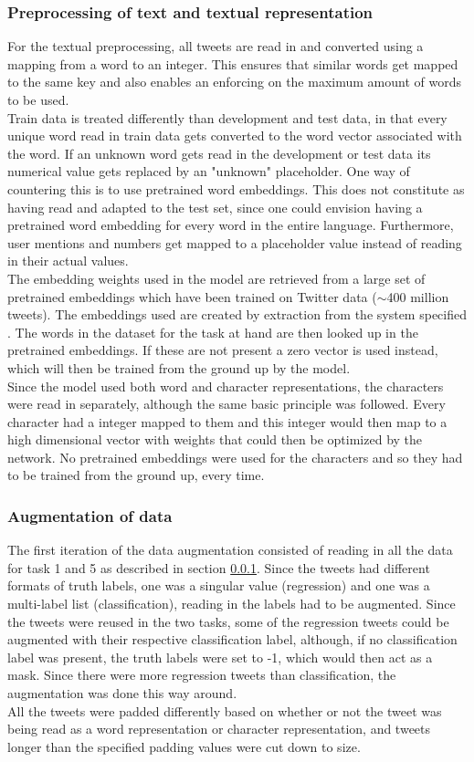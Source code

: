 \subsubsection{Preprocessing of text and textual representation} \label{sec:preprop}
For the textual preprocessing, all tweets are read in and converted using a mapping from a word to an integer. This ensures that similar words get mapped to the same key and also enables an enforcing on the maximum amount of words to be used.\\
Train data is treated differently than development and test data, in that every unique word read in train data gets converted to the word vector associated with the word. If an unknown word gets read in the development or test data its numerical value gets replaced by an "unknown" placeholder. One way of countering this is to use pretrained word embeddings. This does not constitute as having read and adapted to the test set, since one could envision having a pretrained word embedding for every word in the entire language. Furthermore, user mentions and numbers get mapped to a placeholder value instead of reading in their actual values.\\
The embedding weights used in the model are retrieved from a large set of pretrained embeddings which have been trained on Twitter data ($\sim$400 million tweets). The embeddings used are created by extraction from the system specified \cite{godin}. The words in the dataset for the task at hand are then looked up in the pretrained embeddings. If these are not present a zero vector is used instead, which will then be trained from the ground up by the model.\\
Since the model used both word and character representations, the characters were read in separately, although the same basic principle was followed. Every character had a integer mapped to them and this integer would then map to a high dimensional vector with weights that could then be optimized by the network. No pretrained embeddings were used for the characters and so they had to be trained from the ground up, every time.

\subsubsection{Augmentation of data} \label{sec:augm}
The first iteration of the data augmentation consisted of reading in all the data for task 1 and 5 as described in section \ref{sec:preprop}. Since the tweets had different formats of truth labels, one was a singular value (regression) and one was a multi-label list (classification), reading in the labels had to be augmented. Since the tweets were reused in the two tasks, some of the regression tweets could be augmented with their respective classification label, although, if no classification label was present, the truth labels were set to -1, which would then act as a mask. Since there were more regression tweets than classification, the augmentation was done this way around.\\
All the tweets were padded differently based on whether or not the tweet was being read as a word representation or character representation, and tweets longer than the specified padding values were cut down to size. 

